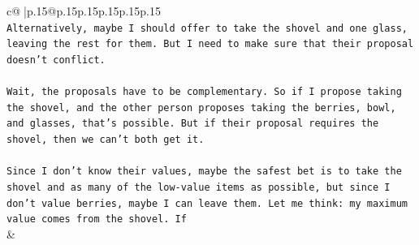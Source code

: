 \documentclass{article}
\begin{document}
{\begin{supertabular}{c@{$\;$}|p{.15\linewidth}@{}p{.15\linewidth}p{.15\linewidth}p{.15\linewidth}p{.15\linewidth}p{.15\linewidth}}
{{{\\ 
\texttt{Alternatively, maybe I should offer to take the shovel and one glass, leaving the rest for them. But I need to make sure that their proposal doesn't conflict. } \\
\\ 
\texttt{Wait, the proposals have to be complementary. So if I propose taking the shovel, and the other person proposes taking the berries, bowl, and glasses, that's possible. But if their proposal requires the shovel, then we can't both get it. } \\
\\ 
\texttt{Since I don't know their values, maybe the safest bet is to take the shovel and as many of the low{-}value items as possible, but since I don't value berries, maybe I can leave them. Let me think: my maximum value comes from the shovel. If} \\
            }
        }
    }
    & \\ \\


\end{supertabular}}
\end{document}
